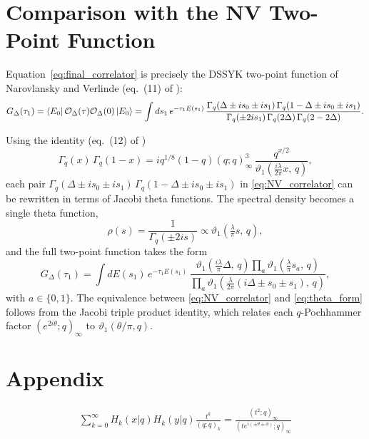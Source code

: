 \documentclass[12pt]{scrarticle}
\begin{document}
\section{Comparison with the NV Two-Point Function}

Equation~\eqref{eq:final_correlator} is precisely the DSSYK two-point function
of Narovlansky and Verlinde \cite{Narovlansky2023} (eq.~(11) of \cite{Verlinde2024}):
\begin{equation}
    G_\Delta(\tau_1)
    = \bra{E_0}\mathcal{O}_\Delta(\tau)\mathcal{O}_\Delta(0)\ket{E_0}
    = \int ds_1\,e^{-\tau_1 E(s_1)}\,
      \frac{\Gamma_q(\Delta\pm is_0\pm is_1)\,\Gamma_q(1-\Delta\pm is_0\pm is_1)}
           {\Gamma_q(\pm 2is_1)\,\Gamma_q(2\Delta)\,\Gamma_q(2-2\Delta)}.
    \label{eq:NV_correlator}
\end{equation}

Using the identity (eq.~(12) of \cite{Verlinde2024})
\begin{equation}
    \Gamma_q(x)\,\Gamma_q(1-x)
    = iq^{1/8}(1-q)(q;q)^3_\infty\,\frac{q^{x/2}}{\vartheta_1\!\left(\tfrac{i\lambda}{2\pi}x,\,q\right)},
    \label{eq:Gamma_theta_identity}
\end{equation}
each pair $\Gamma_q(\Delta\pm is_0\pm is_1)\,\Gamma_q(1-\Delta\pm is_0\pm is_1)$
in \eqref{eq:NV_correlator} can be rewritten in terms of Jacobi theta functions.
The spectral density becomes a single theta function,
\begin{equation}
    \rho(s) = \frac{1}{\Gamma_q(\pm 2is)} \propto \vartheta_1\!\left(\tfrac{\lambda}{\pi}s,\,q\right),
\end{equation}
and the full two-point function takes the form
\begin{equation}
    G_\Delta(\tau_1)
    = \int dE(s_1)\,e^{-\tau_1 E(s_1)}\,
      \frac{\vartheta_1\!\left(\tfrac{i\lambda}{\pi}\Delta,\,q\right)
            \prod_a \vartheta_1\!\left(\tfrac{\lambda}{\pi}s_a,\,q\right)}
           {\prod_a \vartheta_1\!\left(\tfrac{\lambda}{2\pi}(i\Delta\pm s_0\pm s_1),\,q\right)},
    \label{eq:theta_form}
\end{equation}
with $a\in\{0,1\}$. The equivalence between \eqref{eq:NV_correlator} and \eqref{eq:theta_form}
follows from the Jacobi triple product identity, which relates each $q$-Pochhammer factor
$(e^{2i\theta};q)_\infty$ to $\vartheta_1(\theta/\pi,q)$.


\section*{Appendix}

\begin{align}
    \sum_{k=0}^{\infty} H_k(x|q) H_k(y|q) \frac{t^k}{(q;q)_k} = \frac{(t^2; q)_\infty}{(t e^{i(\pm \theta \pm \phi)}; q)_\infty}
    \label{eq:generating_funct}
\end{align}

\newpage
\printbibliography
\end{document}

